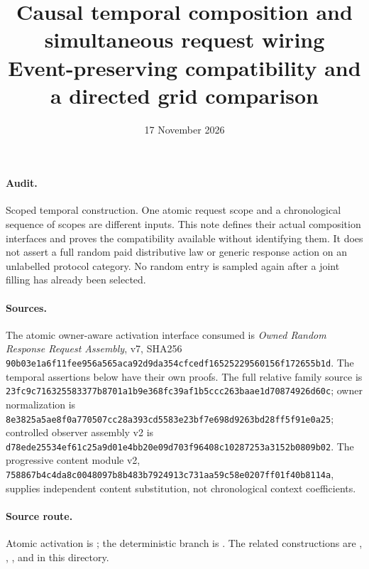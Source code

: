 \documentclass[11pt]{article}\usepackage{amsmath,amssymb,amsthm,geometry}\geometry{margin=1in}
\title{Causal temporal composition and simultaneous request wiring\\Event-preserving compatibility and a directed grid comparison}
\date{17 November 2026}
\begin{document}
\maketitle
\paragraph{Audit.} Scoped temporal construction. One atomic request scope and a chronological sequence of scopes are different inputs. This note defines their actual composition interfaces and proves the compatibility available without identifying them. It does not assert a full random paid distributive law or generic response action on an unlabelled protocol category. No random entry is sampled again after a joint filling has already been selected.

\paragraph{Sources.} The atomic owner-aware activation interface consumed is \emph{Owned Random Response Request Assembly}, v7, SHA256 \texttt{90b03e1a6f11fee956a565aca92d9da354cfcedf16525229560156f172655b1d}. The temporal assertions below have their own proofs. The full relative family source is \texttt{23fc9c716325583377b8701a1b9e368fc39af1b5ccc263baae1d70874926d60c}; owner normalization is \texttt{8e3825a5ae8f0a770507cc28a393cd5583e23bf7e698d9263bd28ff5f91e0a25}; controlled observer assembly v2 is \texttt{d78ede25534ef61c25a9d01e4bb20e09d703f96408c10287253a3152b0809b02}. The progressive content module v2, \texttt{758867b4c4da8c0048097b8b483b7924913c731aa59c58e0207ff01f40b8114a}, supplies independent content substitution, not chronological context coefficients.

\paragraph{Source route.} Atomic activation is \texttt{}; the deterministic branch is \texttt{}. The related constructions are \texttt{}, \texttt{}, \texttt{}, and \texttt{} in this directory.
\end{document}
